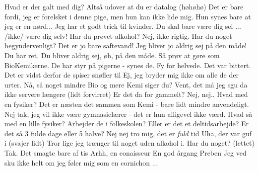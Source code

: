 \documentclass[a4paper,11pt]{article}
\begin{document}
\begin{sketch}
   Hvad er der galt med dig?
   Altså udover at du er datalog (høhøhø)
   Det er bare fordi, jeg er forelsket i denne pige, men hun kan ikke lide mig. Hun synes bare at jeg er en nørd...
   Jeg har et godt trick til kvinder. Du skal bare være dig sel ... /ikke/ være dig selv!
   Har du prøvet alkohol?
   Nej, ikke rigtig. Har du noget begyndervenligt?
   Det er jo bare saftevand!
   Jeg bliver jo aldrig sej på den måde!
   Du har ret. Du bliver aldrig sej, øh, på den måde.
   Så prøv at gøre som BioKemikerne. De har styr på pigerne - synes de.
   Fy for helvede. Det var bittert.
   Det er vidst derfor de spiser snøfler til
   Ej, jeg bryder mig ikke om alle de der urter.
   Nå, så noget mindre Bio og mere Kemi siger du?
   Vent, det må jeg sgu da ikke servere længere
   (lidt forvirret) Er det da for gammelt?
   Nej, nej.. Hvad med en fysiker? Det er næsten det sammen som Kemi - bare lidt mindre anvendeligt.
   Nej tak, jeg vil ikke være gymnasielærer - det er hun alligevel ikke værd.
   Hvad så med en lille fysiker?
   Arbejder de i folkeskolen?  Eller er det et deltidsarbejde? Er det så 3 fulde dage eller 5 halve?
   Nej nej tro mig, det er \emph{fuld} tid
   Uha, der var guf i
   (svajer lidt) Tror lige jeg trænger til noget uden alkohol i. Har du noget?
   (lettet) Tak.
   Det smagte bare af tis
   Arhh, en conaisseur
   En god årgang Preben
   Jeg ved sku ikke helt om jeg føler mig som en cornichon ...


\end{sketch}
\end{document}
